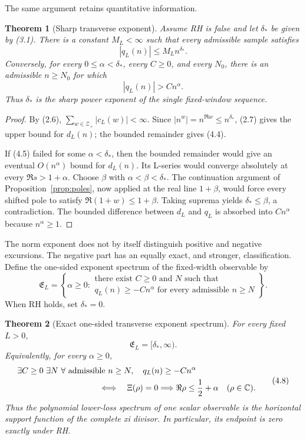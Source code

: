 \documentclass[11pt]{article}
\newtheorem{theorem}{Theorem}[section]
\newcommand{\C}{\mathbb C}
\newcommand{\XiR}{\Xi}
\newcommand{\cZ}{\mathcal Z}
\begin{document}
The same argument retains quantitative information.

\begin{theorem}[Sharp transverse exponent]\label{thm:exponent}
Assume RH is false and let $\delta_*$ be given by (3.1).  There is a constant $M_L<\infty$ such
that every admissible sample satisfies
\[
  |q_L(n)|\le M_L n^{\delta_*}.
  \tag{4.4}
\]
Conversely, for every $0\le\alpha<\delta_*$, every $C\ge0$, and every $N_0$, there is an
admissible $n\ge N_0$ for which
\[
  |q_L(n)|>Cn^\alpha.
  \tag{4.5}
\]
Thus $\delta_*$ is the sharp power exponent of the single fixed-window sequence.
\end{theorem}

\begin{proof}
By (2.6), $\sum_{w\in\cZ_+}|c_L(w)|<\infty$.  Since
$|n^w|=n^{\Re w}\le n^{\delta_*}$, (2.7) gives the upper bound for $d_L(n)$; the bounded
remainder gives (4.4).

If (4.5) failed for some $\alpha<\delta_*$, then the bounded remainder would give an eventual
$O(n^\alpha)$ bound for $d_L(n)$.  Its L-series would converge absolutely at every
$\Re s>1+\alpha$.  Choose $\beta$ with $\alpha<\beta<\delta_*$.  The continuation argument of
Proposition~\ref{prop:poles}, now applied at the real line $1+\beta$, would force every shifted
pole to satisfy $\Re(1+w)\le1+\beta$.  Taking suprema yields $\delta_*\le\beta$, a contradiction.
The bounded difference between $d_L$ and $q_L$ is absorbed into $Cn^\alpha$ because
$n^\alpha\ge1$.
\end{proof}

The norm exponent does not by itself distinguish positive and negative excursions.  The negative
part has an equally exact, and stronger, classification.  Define the one-sided exponent spectrum
of the fixed-width observable by
\[
 \mathfrak E_L=
 \left\{\alpha\ge0:
 \begin{array}{c}
 \text{there exist }C\ge0\text{ and }N\text{ such that}\\[-2pt]
 q_L(n)\ge-Cn^\alpha\text{ for every admissible }n\ge N
 \end{array}\right\}.
 \tag{4.6}
\]
When RH holds, set $\delta_*=0$.

\begin{theorem}[Exact one-sided transverse exponent spectrum]\label{thm:onesided-spectrum}
For every fixed $L>0$,
\[
 \mathfrak E_L=[\delta_*,\infty).
 \tag{4.7}
\]
Equivalently, for every $\alpha\ge0$,
\[
 \begin{split}
 &\exists C\ge0\ \exists N\ \forall\text{ admissible }n\ge N,
       \quad q_L(n)\ge-Cn^\alpha\\
 &\hspace{35mm}\Longleftrightarrow\quad
 \XiR(\rho)=0\Longrightarrow
       \Re\rho\le\frac12+\alpha\quad(\rho\in\C).
 \end{split}
 \tag{4.8}
\]
Thus the polynomial lower-loss spectrum of one scalar observable is the horizontal support
function of the complete xi divisor.  In particular, its endpoint is zero exactly under RH.
\end{theorem}
\end{document}
